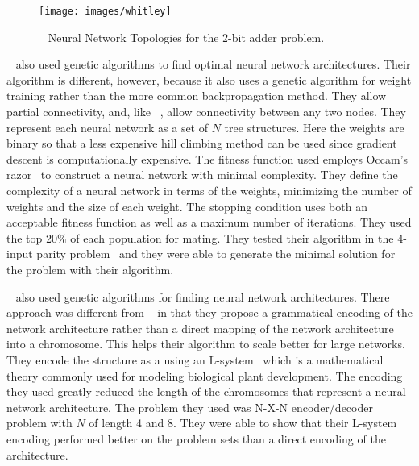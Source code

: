 \begin{figure}[htb!]
  \centering
  \texttt{[image: images/whitley]}
  \caption{~\cite{whitley} Neural Network Topologies for the 2-bit
    adder problem.}
  \label{whitley1}
\end{figure}  

~\cite{zhang} also used genetic algorithms to find optimal neural
network architectures. 
Their algorithm is different, however, because it also uses a genetic
algorithm for weight training rather than the more common
backpropagation method.
They allow partial connectivity, and, like ~\cite{whitley}, allow connectivity between any two nodes.
They represent each neural network as a set of $N$ tree structures.
Here the weights are binary so that a less expensive hill climbing
method can be used since gradient descent is computationally
expensive.
The fitness function used employs Occam's razor~\cite{occamsRazor} to construct a neural
network with minimal complexity.
They define the complexity of a neural network in terms of the
weights, minimizing the number of weights and the size of each weight.
The stopping condition uses both an acceptable fitness function as
well as a maximum number of iterations.
They used the top $20\%$ of each population for mating.
They tested their algorithm in the 4-input parity problem~\cite{4bit} and they
were able to generate the minimal solution for the problem with their
algorithm.

~\cite{kitano} also used genetic algorithms for finding neural network
architectures.
There approach was different from ~\cite{whitley} in
that they propose a grammatical encoding of the network architecture
rather than a direct mapping of the network architecture into a
chromosome.
This helps their algorithm to scale better for large networks.
They encode the structure as a using an L-system~\cite{lSystem} which
is a mathematical theory commonly used for modeling biological plant
development.
The encoding they used greatly reduced the length of the chromosomes
that represent a neural network architecture.
The problem they used was N-X-N encoder/decoder
problem with $N$ of length 4 and 8. 
They were able to show that their L-system encoding performed better
on the problem sets than a direct encoding of the architecture.









 

